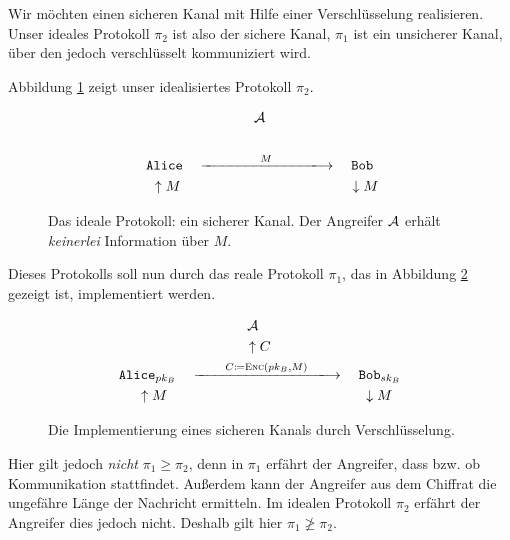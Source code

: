 \begin{beispiel}
	Wir möchten einen sicheren Kanal mit Hilfe einer Verschlüsselung realisieren. Unser ideales Protokoll $\pi_2$ ist also der sichere Kanal, $\pi_1$ ist ein unsicherer Kanal, über den jedoch verschlüsselt kommuniziert wird.
	
	Abbildung \ref{fig:protocols:reallysecurechannel} zeigt unser idealisiertes Protokoll $\pi_2$.
	\begin{figure}[hbtp]
		\begin{center}
			\begin{gather*}
				\advA\\
				\\
				\texttt{Alice} \quad \xlongrightarrow{\qquad\qquad M\qquad\qquad}
				\quad \texttt{Bob}\\
				\quad\uparrow M\qquad\qquad\qquad\qquad\qquad\qquad\downarrow M
		    \end{gather*}
		\end{center}
		\caption{Das ideale Protokoll: ein sicherer Kanal. Der Angreifer $\mathcal{A}$ erhält \emph{keinerlei} Information über $M$.}
		\label{fig:protocols:reallysecurechannel}
	\end{figure}
	Dieses Protokolls soll nun durch das reale Protokoll $\pi_1$, das in Abbildung \ref{fig:protocols:insecurechannelwithencryption} gezeigt ist, implementiert werden.
	
	\begin{figure}[hbtp]
		\begin{center}
			\begin{gather*}
				\advA\quad\\
				\uparrow C\\
				\texttt{Alice}_{\pkey_B}\quad
				\xlongrightarrow{\qquad C\coloneqq\enc(\pkey_B,M)\qquad}
				\quad\texttt{Bob}_{\skey_B}\\
				\quad\uparrow M\qquad\qquad\qquad\qquad\qquad\qquad\qquad\downarrow M
			\end{gather*}
		\end{center}
		\caption{Die Implementierung eines sicheren Kanals durch Verschlüsselung.}
		\label{fig:protocols:insecurechannelwithencryption}
	\end{figure}
	
	Hier gilt jedoch \emph{nicht} $\pi_1 \geq \pi_2$, denn in $\pi_1$ erfährt der Angreifer, dass bzw. ob Kommunikation stattfindet. Außerdem kann der Angreifer aus dem Chiffrat die ungefähre Länge der Nachricht ermitteln. Im idealen Protokoll $\pi_2$ erfährt der Angreifer dies jedoch nicht. Deshalb gilt hier $\pi_1 \not\geq \pi_2$.
\end{beispiel}

